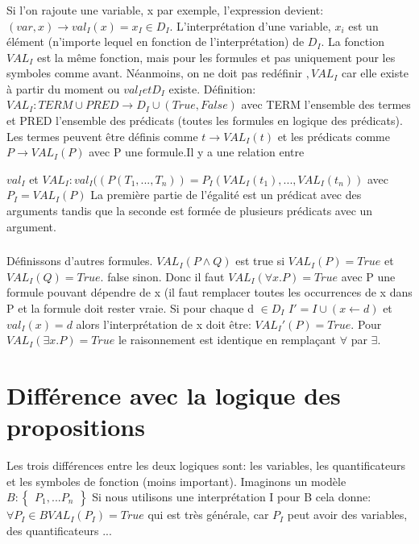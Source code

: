 \subsubsection{}
Si l'on rajoute une variable, x par exemple, l'expression devient: $ (var, x) \rightarrow val_{I}(x) = x_{I} \in D_{I}$. L'interprétation d'une variable, $x_{i}$ est un élément (n'importe lequel en fonction de l'interprétation) de $D_{I}$. La fonction $VAL_{I}$ est la même fonction, mais pour les formules et pas uniquement pour les symboles comme avant. Néanmoins, on ne doit pas redéfinir $,VAL_{I}$ car elle existe à partir du moment ou $val_{I} et D_{I}$ existe. Définition: $VAL_{I}: TERM \cup  PRED \rightarrow D_{I} \cup (True, False) $ avec TERM l'ensemble des termes et PRED l'ensemble des
prédicats (toutes les formules en logique des prédicats). Les termes peuvent être définis comme $ t \rightarrow VAL_{I}(t)$ et les prédicats comme $ P \rightarrow VAL_{I}(P)$ avec P une formule.Il y a une relation entre 

$val_{I} $ et $ VAL_{I}: val_{I}((P(T_{1},...,T_{n})) = P_{I}(VAL_{I}(t_{1}),...,VAL_{I}(t_{n}))$ avec $ P_{I} = VAL_{I}(P)$ 
La première partie de l'égalité est un prédicat avec des arguments tandis que la seconde est formée de plusieurs prédicats avec un argument. 
\subsubsection{}
Définissons d'autres formules. $VAL_{I}(P \wedge Q) $ est true si $VAL_{I}(P) = True$ et $VAL_{I}(Q) = True$. false sinon. Donc il faut $VAL_{I}(\forall x.P) = True$ avec P une formule pouvant dépendre de x (il faut remplacer toutes les occurrences de x dans P et la formule doit rester vraie. Si pour chaque d $\in D_{I}$ $ I' = I \cup (x \leftarrow d)$ et $val_{I}(x) = d$ alors l'interprétation de x doit être: $VAL_{I}'(P) = True$.
Pour $VAL_{I}(\exists x.P) = True$ le raisonnement est identique en remplaçant $\forall$ par $\exists$.
\section{Différence avec la logique des propositions}
Les trois différences entre les deux logiques sont: les variables, les quantificateurs et les symboles de fonction (moins important). Imaginons un modèle $B: 
\left\{
  \begin{array}{rcr}
    P_{1},...P_{n}
  \end{array}
\right\}
$
Si nous utilisons une interprétation I pour B cela donne:
$\forall P_{I} \in B VAL_{I}(P_{I}) = True$ qui est très générale, car $P_{I}$ peut avoir des variables, des quantificateurs ...

